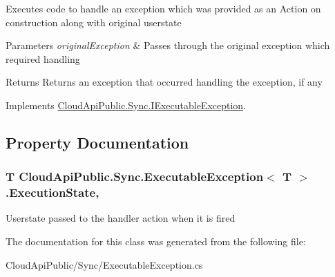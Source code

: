 Executes code to handle an exception which was provided as an Action on construction along with original userstate 


\begin{DoxyParams}{Parameters}
{\em original\-Exception} & Passes through the original exception which required handling\\
\hline
\end{DoxyParams}
\begin{DoxyReturn}{Returns}
Returns an exception that occurred handling the exception, if any
\end{DoxyReturn}


Implements \hyperlink{interface_cloud_api_public_1_1_sync_1_1_i_executable_exception_aba847c78adff005e30f9ab156995483f}{Cloud\-Api\-Public.\-Sync.\-I\-Executable\-Exception}.



\subsection{Property Documentation}
\hypertarget{class_cloud_api_public_1_1_sync_1_1_executable_exception_3_01_t_01_4_a7ac09d33b3a81c717dc1da3366fdc7e0}{
\subsubsection[{Execution\-State}]{\setlength{\rightskip}{0pt plus 5cm}T Cloud\-Api\-Public.\-Sync.\-Executable\-Exception$<$ T $>$.Execution\-State\hspace{0.3cm}{\ttfamily [get]}, {\ttfamily [set]}}}\label{class_cloud_api_public_1_1_sync_1_1_executable_exception_3_01_t_01_4_a7ac09d33b3a81c717dc1da3366fdc7e0}


Userstate passed to the handler action when it is fired 



The documentation for this class was generated from the following file\-:\begin{DoxyCompactItemize}
\item 
Cloud\-Api\-Public/\-Sync/Executable\-Exception.\-cs\end{DoxyCompactItemize}
